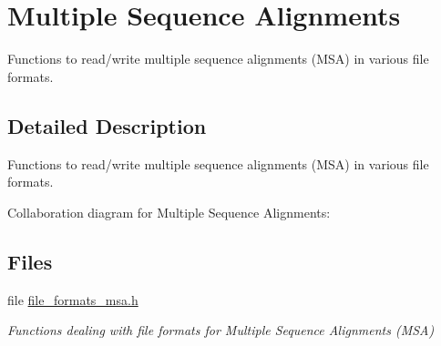 \hypertarget{group__file__formats__msa}{}\section{Multiple Sequence Alignments}
\label{group__file__formats__msa}


Functions to read/write multiple sequence alignments (M\+SA) in various file formats.  




\subsection{Detailed Description}
Functions to read/write multiple sequence alignments (M\+SA) in various file formats. 

Collaboration diagram for Multiple Sequence Alignments\+:
\subsection*{Files}
\begin{DoxyCompactItemize}
\item 
file \mbox{\hyperlink{io_2file__formats__msa_8h}{file\+\_\+formats\+\_\+msa.\+h}}
\begin{DoxyCompactList}\small\item\em Functions dealing with file formats for Multiple Sequence Alignments (M\+SA) \end{DoxyCompactList}\end{DoxyCompactItemize}
